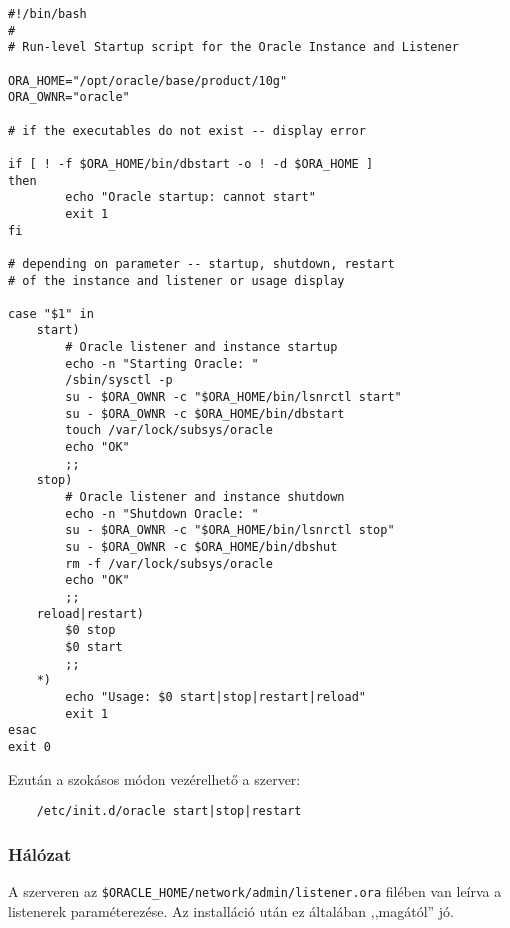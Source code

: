 \begin{verbatim}
#!/bin/bash
#
# Run-level Startup script for the Oracle Instance and Listener

ORA_HOME="/opt/oracle/base/product/10g"
ORA_OWNR="oracle"

# if the executables do not exist -- display error

if [ ! -f $ORA_HOME/bin/dbstart -o ! -d $ORA_HOME ]
then
        echo "Oracle startup: cannot start"
        exit 1
fi

# depending on parameter -- startup, shutdown, restart 
# of the instance and listener or usage display 

case "$1" in
    start)
        # Oracle listener and instance startup
        echo -n "Starting Oracle: "
        /sbin/sysctl -p
        su - $ORA_OWNR -c "$ORA_HOME/bin/lsnrctl start"
        su - $ORA_OWNR -c $ORA_HOME/bin/dbstart
        touch /var/lock/subsys/oracle
        echo "OK"
        ;;
    stop)
        # Oracle listener and instance shutdown
        echo -n "Shutdown Oracle: "
        su - $ORA_OWNR -c "$ORA_HOME/bin/lsnrctl stop"
        su - $ORA_OWNR -c $ORA_HOME/bin/dbshut
        rm -f /var/lock/subsys/oracle
        echo "OK"
        ;;
    reload|restart)
        $0 stop
        $0 start
        ;;
    *)
        echo "Usage: $0 start|stop|restart|reload"
        exit 1
esac
exit 0
\end{verbatim}


Ezután a szokásos módon vezérelhető a szerver:

\begin{verbatim}
    /etc/init.d/oracle start|stop|restart
\end{verbatim}


\subsubsection*{Hálózat}

A szerveren az \verb!$ORACLE_HOME/network/admin/listener.ora!
filében van leírva a listenerek paraméterezése. Az installáció
után ez általában ,,magától'' jó.

